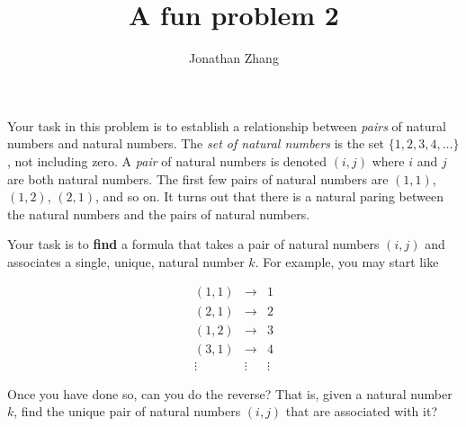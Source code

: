 \documentclass[letterpaper,twoside,12pt]{article}
\theoremstyle{mystyle}
\begin{document}
\title{\vspace{-2\baselineskip} 
A fun problem 2
}
\author{Jonathan Zhang  }
\date{}
\maketitle

Your task in this problem is to establish a relationship between \textit{pairs} of natural numbers and natural numbers.
The \textit{set of natural numbers} is the set $\{1, 2, 3, 4, \dots\}$, not including zero. 
A \textit{pair} of natural numbers is denoted $(i, j)$ where $i$ and $j$ are both natural numbers. The first few pairs of natural numbers are $(1, 1)$, $(1, 2)$, $(2, 1)$, and so on. It turns out that there is a natural paring between the natural numbers and the pairs of natural numbers. 

Your task is to \textbf{find} a formula that takes a pair of natural numbers $(i,j)$ and associates a single, unique, natural number $k$. For example, you may start like 

\[\begin{array}{*{20}{c}}
  {\left( {1,1} \right)}& \to &1 \\ 
  {\left( {2,1} \right)}& \to &2 \\ 
  {\left( {1,2} \right)}& \to &3 \\ 
  {\left( {3,1} \right)}& \to &4 \\ 
   \vdots & \vdots & \vdots  
\end{array}\]

Once you have done so, can you do the reverse? That is, given a natural number $k$, find the unique pair of natural numbers $\left( i,j \right)$ that are associated with it? 
\end{document}
